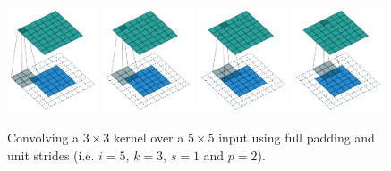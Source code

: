 \documentclass{report}
\begin{document}
\begin{figure}[p]
    \centering
    \includegraphics[width=0.24\textwidth]{pdf/full_padding_no_strides_00.pdf}
    \includegraphics[width=0.24\textwidth]{pdf/full_padding_no_strides_01.pdf}
    \includegraphics[width=0.24\textwidth]{pdf/full_padding_no_strides_02.pdf}
    \includegraphics[width=0.24\textwidth]{pdf/full_padding_no_strides_03.pdf}
    \caption{\label{fig:full_padding_no_strides} Convolving a $3 \times 3$
        kernel over a $5 \times 5$ input using full padding and unit strides
        (i.e. $i = 5$, $k = 3$, $s = 1$ and $p = 2$).}
\end{figure}
\end{document}
